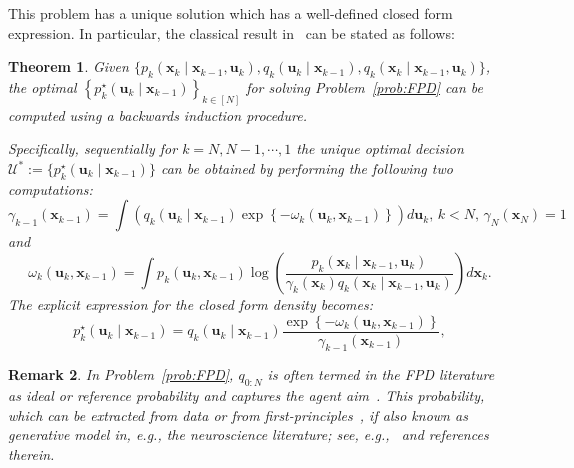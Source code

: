 \documentclass[a4paper,fleqn]{cas-sc}
\newcommand{\todoinb}[1]{\todo[inline,color=blue!20, linecolor=orange!250]{\small#1}}
\newcommand{\grtodo}[1]{\todoinb{\textbf{From GR:} #1}}
\newcommand{\bv}[1]{\mathbf{#1}}
\newcommand{\sU}{\mathcal{U}}
\newcommand{\plant}[2]{p_{{#1}} \left(\bv{x}_{{#1}}\mid \bv{x}_{{#2}}, \bv{u}_{{#1}} \right)}
\newcommand{\optimalpolicy}[2]{p^{\star}_{{#1}} \left(\bv{u}_{{#1}}\mid \bv{x}_{{#2}} \right)}
\newcommand{\refplant}[2]{q_{{#1}} \left(\bv{x}_{{#1}}\mid \bv{x}_{{#2}}, \bv{u}_{{#1}} \right)}
\newcommand{\refpolicy}[2]{q_{{#1}}\left(\bv{u}_{{#1}}\mid \bv{x}_{{#2}} \right)}
\newtheorem{theorem}{Theorem}[section]
\newtheorem{remark}[theorem]{Remark}
\begin{document}
This problem has a unique solution which has a well-defined closed form expression. In particular, the classical result in~\cite[Theorem 6.1]{karny2012axiomatisation} can be stated as follows:
\begin{theorem}\label{thm:klfpdsoln}
    Given $\{\plant{k}{k-1},\refpolicy{k}{k-1},\refplant{k}{k-1}\}$, the optimal ${\left\{\optimalpolicy{k}{k-1}\right\}_{k\in[N]}}$ for solving Problem~\ref{prob:FPD} can be computed using a backwards induction procedure.
    
    Specifically, sequentially for $k=N,N-1,\cdots,1$ the unique optimal decision $\sU^*:=\{\optimalpolicy{k}{k-1}\}$ can be obtained by performing the following two computations:
    \[
   \gamma_{k-1}(\bv{x}_{k-1}) =\int\left(\refpolicy{k}{k-1}\exp\left\{-
   \omega_k(\bv{u}_k,\bv{x}_{k-1})\right\}\right)d\bv{u}_k
    ,\, k<N,\,\gamma_N(\bv{x}_N)=1
    \]
    and
    \[
    \omega_k(\bv{u}_k,\bv{x}_{k-1})=\int p_k(\bv{u}_k,\bv{x}_{k-1})\log\left(\frac{\plant{k}{k-1}}{\gamma_k(\bv{x}_{k})\refplant{k}{k-1}}\right)d\bv{x}_k.
    \]
    The explicit expression for the closed form density becomes:
    \[
    \optimalpolicy{k}{k-1}= \refpolicy{k}{k-1}\frac{\exp\left\{-\omega_k(\bv{u}_k,\bv{x}_{k-1})\right\}}{\gamma_{k-1}(\bv{x}_{k-1})},
    \]
\end{theorem}



\begin{remark}
In Problem~\ref{prob:FPD}, $q_{0:N}$ is often termed in the FPD literature as ideal or reference probability and captures the {\em agent aim}~\cite{MK-SM:25}. This probability, which can be extracted from data or from first-principles~\cite{gagliardi2022probabilistic}, if also known as generative model in, e.g., the neuroscience literature; see, e.g.,~\cite{AS-HJ-KF-GR:25} and references therein.
\end{remark}

\end{document}
